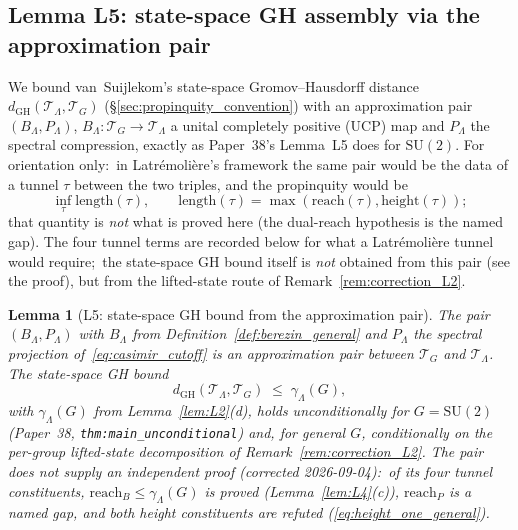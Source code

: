 \documentclass[11pt,a4paper]{article}
\theoremstyle{plain}
\newtheorem{lemma}[theorem]{Lemma}
\theoremstyle{definition}
\newcommand{\Lammax}{\Lambda}
\newcommand{\Tcal}{\mathcal{T}}
\newcommand{\SU}{\mathrm{SU}}
\begin{document}
\subsection{Lemma L5: state-space GH assembly via the approximation pair}\label{sec:L5}

We bound van~Suijlekom's state-space Gromov--Hausdorff distance
$d_{\mathrm{GH}}(\Tcal_\Lammax, \Tcal_G)$
(\S\ref{sec:propinquity_convention}) with an approximation pair
$(B_\Lammax, P_\Lammax)$, $B_\Lammax: \Tcal_G \to \Tcal_\Lammax$ a
unital completely positive (UCP) map and $P_\Lammax$ the spectral
compression, exactly as Paper~38's Lemma~L5 does for $\SU(2)$. For
orientation only:\ in Latr\'emoli\`ere's framework the same pair would
be the data of a tunnel $\tau$ between the two triples, and the
propinquity would be
\begin{equation}\label{eq:propinquity_def_general}
   \inf_\tau \mathrm{length}(\tau), \qquad
   \mathrm{length}(\tau) = \max(\mathrm{reach}(\tau),
   \mathrm{height}(\tau));
\end{equation}
that quantity is \emph{not} what is proved here (the dual-reach
hypothesis is the named gap). The four tunnel terms are recorded below
for what a Latr\'emoli\`ere tunnel would require;\ the state-space GH
bound itself is \emph{not} obtained from this pair (see the proof), but
from the lifted-state route of Remark~\ref{rem:correction_L2}.

\begin{lemma}[L5: state-space GH bound from the approximation pair]\label{lem:L5}
The pair $(B_\Lammax, P_\Lammax)$ with $B_\Lammax$ from
Definition~\ref{def:berezin_general} and $P_\Lammax$ the spectral
projection of~\eqref{eq:casimir_cutoff} is an approximation pair between
$\Tcal_G$ and $\Tcal_\Lammax$. The state-space GH bound
\begin{equation}\label{eq:L5_bound_general}
   d_{\mathrm{GH}}(\Tcal_\Lammax, \Tcal_G)
   \;\le\; \gamma_\Lammax(G),
\end{equation}
with $\gamma_\Lammax(G)$
from Lemma~\ref{lem:L2}(d), holds unconditionally for $G = \SU(2)$
(Paper~38, \texttt{thm:main\_unconditional}) and, for general $G$,
conditionally on the per-group lifted-state decomposition of
Remark~\ref{rem:correction_L2}. \emph{The pair does not supply an
independent proof} (corrected 2026-09-04):\ of its four tunnel
constituents, $\mathrm{reach}_B \le \gamma_\Lammax(G)$ is proved
(Lemma~\ref{lem:L4}(c)), $\mathrm{reach}_P$ is a named gap, and both
height constituents are refuted (\eqref{eq:height_one_general}).
\end{lemma}
\end{document}
